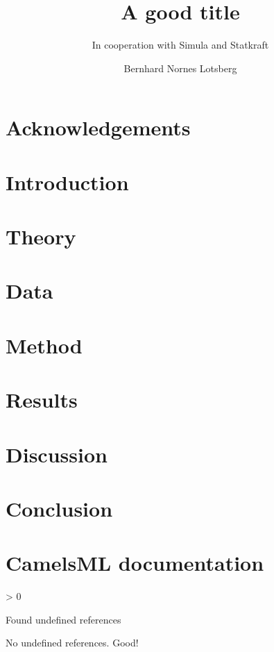 \documentclass[10pt,a4paper,english, twoside]{report}
\title{A good title}
\subtitle{In cooperation with Simula and Statkraft}
\author{Bernhard Nornes Lotsberg}
\newcounter{undefinedreferences}
\newcommand{\checkreferences}{
	\ifnum\value{undefinedreferences} > 0
	\begin{center}
	\begin{Huge}
	Found undefined references
	\end{Huge}
	\end{center}
	\else
	No undefined references. Good!
	\fi
}
\begin{document}
\duoforside[
    dept={Department of Physics},
    program={Computational Science: physics},
    long]

%

\chapter*{Acknowledgements}
\thispagestyle{empty}

\clearpage


\setcounter{page}{1}
\tableofcontents
\printglossaries 
\listoffigures
\listoftables

\chapter{Introduction}


\newpage
\chapter{Theory}


\newpage
\chapter{Data}
\label{data}


\newpage
\chapter{Method}
\label{Data}


\newpage
\chapter{Results} 


\newpage
\chapter{Discussion}


\newpage
\chapter{Conclusion}

\nocite{scikit-learn}



\newpage
\appendix
\chapter{CamelsML documentation}

\checkreferences
\end{document}
